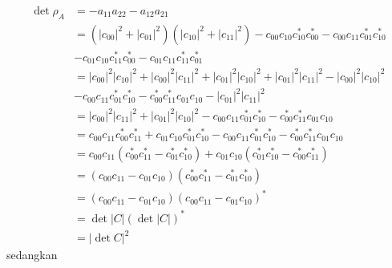 \begin{equation}
	\begin{aligned}
		\det \rho_A
		&=-a_{11}a_{22}-a_{12}a_{21}\\
		&= (|c_{00}|^2 + |c_{01}|^2)(|c_{10}|^2 + |c_{11}|^2) - c_{00} c_{10} c^{*}_{10} c^{*}_{00} - c_{00} c_{11} c^{*}_{01} c^{*}_{10}\\
		&- c_{01} c_{10} c^{*}_{11} c^{*}_{00} - c_{01} c_{11} c^{*}_{11} c^{*}_{01}\\
		&= |c_{00}|^2 |c_{10}|^2
		+ |c_{00}|^2 |c_{11}|^2
		+ |c_{01}|^2 |c_{10}|^2
		+ |c_{01}|^2 |c_{11}|^2- |c_{00}|^2 |c_{10}|^2\\
		&- c_{00} c_{11} c^{*}_{01} c^{*}_{10}
		- c^{*}_{00} c^{*}_{11} c_{01} c_{10}- |c_{01}|^2 |c_{11}|^2\\
		&= |c_{00}|^2 |c_{11}|^2
		+ |c_{01}|^2 |c_{10}|^2
		- c_{00} c_{11} c^{*}_{01} c^{*}_{10}
		- c^{*}_{00} c^{*}_{11} c_{01} c_{10}\\
		&=c_{00} c_{11} c^{*}_{00} c^{*}_{11}
		+ c_{01} c_{10} c^{*}_{01} c^{*}_{10}-c_{00} c_{11} c^{*}_{01} c^{*}_{10}-c^{*}_{00} c^{*}_{11}c_{01} c_{10} \\
		&= c_{00}c_{11}(c^{*}_{00} c^{*}_{11} - c^{*}_{01} c^{*}_{10})+c_{01}c_{10}(c^{*}_{01} c^{*}_{10} - c^{*}_{00} c^{*}_{11})\\
		&= (c_{00} c_{11} - c_{01} c_{10})
		(c^{*}_{00} c^{*}_{11} - c^{*}_{01} c^{*}_{10})\\
		&= (c_{00} c_{11} - c_{01} c_{10})
		(c_{00} c_{11} - c_{01} c_{10})^{*}\\
		&= \det |C| (\det |C|)^{*}\\
		&= |\det C|^2
	\end{aligned}
\end{equation}
sedangkan

